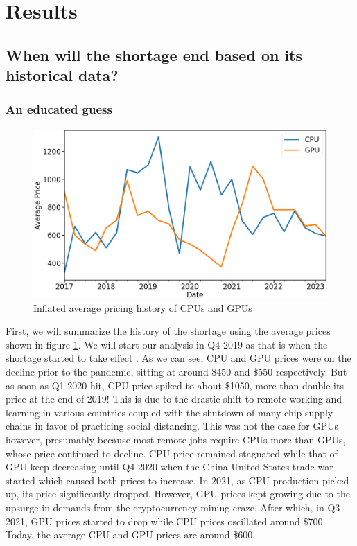 \documentclass[conference]{IEEEtran}
\begin{document}
\section{Results}
\subsection{When will the shortage end based on its historical data?}

\subsubsection{An educated guess}
\begin{figure}[htbp]
	\centerline{\includegraphics[width=\columnwidth]{avg_price.png}}
	\caption{Inflated average pricing history of CPUs and GPUs}
	\label{fig3}
\end{figure}
First, we will summarize the history of the shortage using the average prices
shown in figure \ref{fig3}. We will start our analysis in Q4 2019 as that is
when the shortage started to take effect \cite{Wikipedia:2023}. As we can see,
CPU and GPU prices
were on the decline prior to the pandemic, sitting at around \$450 and \$550
respectively. But as soon as Q1 2020 hit, CPU price spiked to about \$1050,
more than double its price at the end of 2019! This is due to the drastic
shift to remote working and learning in various countries coupled with the
shutdown of many chip supply chains in favor of practicing social distancing.
This was not the case for GPUs however, presumably because most remote jobs
require CPUs more than GPUs, whose price continued to decline. CPU price
remained stagnated while that of GPU keep decreasing until Q4 2020 when the
China-United States trade war started which caused both prices to increase.
In 2021, as CPU production picked up, its price significantly dropped.
However, GPU prices kept growing due to the upsurge in demands from the
cryptocurrency mining craze. After which, in Q3 2021, GPU prices started
to drop while CPU prices oscillated around \$700. Today, the average CPU and
GPU prices are around \$600.
\end{document}
